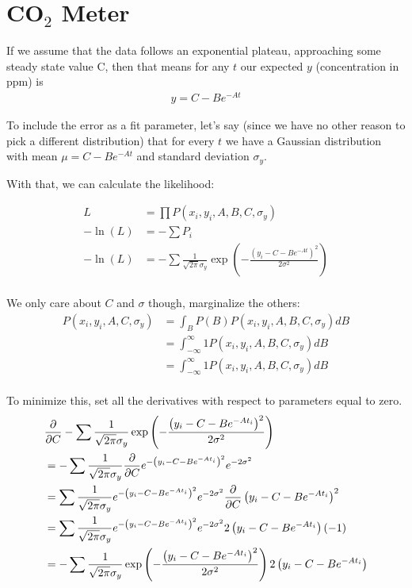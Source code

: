 \section{\texorpdfstring{CO$_2$}{CO2} Meter}

If we assume that the data follows an exponential plateau, approaching some steady state value C, then that means for any $t$ our expected $y$ (concentration in ppm) is
\begin{align*}
    y = C - B e^{-At}
\end{align*}

To include the error as a fit parameter, let's say (since we have no other reason to pick a different distribution) that for every $t$ we have a Gaussian distribution with mean $\mu = C - B e^{-At}$ and standard deviation $\sigma_y$.

With that, we can calculate the likelihood:

\begin{align*}
    L &= \prod P(x_i, y_i, A, B, C, \sigma_y) \\
    -\ln(L) &= -\sum P_i \\
    -\ln(L) &= -\sum \frac{1}{\sqrt{2\pi}\sigma_y}\exp\left(-\frac{\left(y_i - C - B e^{-At}\right)^2}{2\sigma^2}\right) \\
\end{align*}

We only care about $C$ and $\sigma$ though, marginalize the others:
\begin{align*}
    P(x_i, y_i, A, C, \sigma_y) &= \int_B P(B) P(x_i, y_i, A, B, C, \sigma_y) dB \\
    &= \int_{-\infty}^\infty 1 P(x_i, y_i, A, B, C, \sigma_y) dB \\
    &= \int_{-\infty}^\infty 1 P(x_i, y_i, A, B, C, \sigma_y) dB \\
\end{align*}

To minimize this, set all the derivatives with respect to parameters equal to zero.
\begin{align*}
    &\frac{\partial}{\partial C}-\sum \frac{1}{\sqrt{2\pi}\sigma_y}\exp\left(-\frac{\left(y_i - C - B e^{-At_i}\right)^2}{2\sigma^2}\right) \\
    &=-\sum \frac{1}{\sqrt{2\pi}\sigma_y}\frac{\partial}{\partial C}e^{-\left(y_i - C - B e^{-At_i}\right)^2}e^{-2\sigma^2} \\
    &=\sum \frac{1}{\sqrt{2\pi}\sigma_y}e^{-\left(y_i - C - B e^{-At_i}\right)^2}e^{-2\sigma^2}\frac{\partial}{\partial C}\left(y_i - C - B e^{-At_i}\right)^2 \\
    &=\sum \frac{1}{\sqrt{2\pi}\sigma_y}e^{-\left(y_i - C - B e^{-At_i}\right)^2}e^{-2\sigma^2}2\left(y_i - C - B e^{-At_i}\right)(-1) \\
    &=-\sum \frac{1}{\sqrt{2\pi}\sigma_y}\exp\left(-\frac{\left(y_i - C - B e^{-At_i}\right)^2}{2\sigma^2}\right)2\left(y_i - C - B e^{-At_i}\right) \\
\end{align*}


